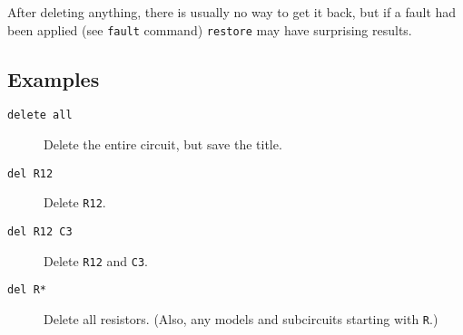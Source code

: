 After deleting anything, there is usually no way to get it back, but if a
fault had been applied (see {\tt fault} command) {\tt restore} may have
surprising results.
\subsection{Examples}

\begin{description}

\item[{\tt delete all}] Delete the entire circuit, but save the title.

\item[{\tt del R12}] Delete {\tt R12}.

\item[{\tt del R12 C3}] Delete {\tt R12} and {\tt C3}.

\item[{\tt del R*}] Delete all resistors.  (Also, any models and subcircuits
starting with {\tt R}.)

\end{description}
